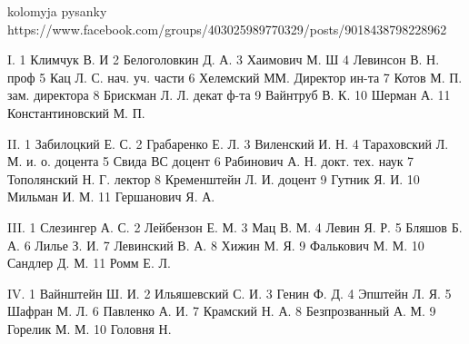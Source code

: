 kolomyja pysanky
https://www.facebook.com/groups/403025989770329/posts/9018438798228962

I. 1 Климчук В. И
   2 Белоголовкин Д. А.
   3 Хаимович М. Ш
   4 Левинсон В. Н. проф
   5 Кац Л. С. нач. уч. части
   6 Хелемский ММ. Директор ин-та
   7 Котов М. П. зам. директора
   8 Брискман Л. Л. декат ф-та
   9 Вайнтруб В. К.
   10 Шерман А.
   11 Константиновский М. П.

II. 1 Забилоцкий Е. С.
    2 Грабаренко Е. Л.
    3 Виленский И. Н.
    4 Тараховский Л. М. и. о. доцента
    5 Свида ВС доцент
    6 Рабинович А. Н. докт. тех. наук
    7 Тополянский Н. Г. лектор
    8 Кременштейн Л. И. доцент
    9 Гутник Я. И.
    10 Мильман И. М.
    11 Гершанович Я. А.

III. 1 Слезингер А. С.
     2 Лейбензон Е. М.
     3 Мац В. М.
     4 Левин Я. Р.
     5 Бляшов Б. А.
     6 Лилье З. И.
     7 Левинский В. А.
     8 Хижин М. Я.
     9 Фалькович М. М.
     10 Сандлер Д. М.
     11 Ромм Е. Л.

IV. 1 Вайнштейн Ш. И.
    2 Ильяшевский С. И.
    3 Генин Ф. Д.
    4 Эпштейн Л. Я.
    5 Шафран М. Л.
    6 Павленко А. И.
    7 Крамский Н. А.
    8 Безпрозванный А. М.
    9 Горелик М. М.
    10 Головня Н.

